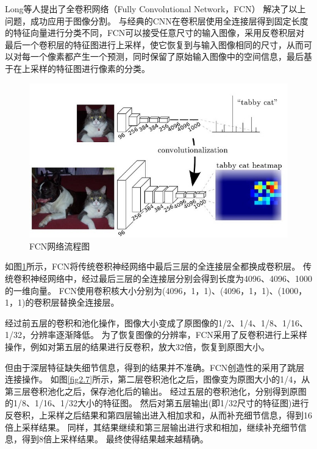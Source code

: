 Long等人提出了全卷积网络（Fully Convolutional Network，FCN）\cite{long2015fully} 解决了以上问题，成功应用于图像分割。
与经典的CNN在卷积层使用全连接层得到固定长度的特征向量进行分类不同，FCN可以接受任意尺寸的输入图像，采用反卷积层对最后一个卷积层的特征图进行上采样，使它恢复到与输入图像相同的尺寸，从而可以对每一个像素都产生一个预测，同时保留了原始输入图像中的空间信息，最后基于在上采样的特征图进行像素的分类。

\begin{figure}[h]
\begin{center}
\includegraphics[width=1\textwidth]{figures/FCN1.jpg}
\end{center}
\vspace{-5mm}
\caption{FCN网络流程图}
\label{fig2.6}
\end{figure}

如图\ref{fig2.6}所示，FCN将传统卷积神经网络中最后三层的全连接层全都换成卷积层。
传统卷积神经网络中，经过最后三层的全连接层分别会得到长度为4096、4096、1000的一维向量。
FCN使用卷积核大小分别为(4096，1，1)、(4096，1，1)、(1000，1，1)的卷积层替换全连接层。

经过前五层的卷积和池化操作，图像大小变成了原图像的1/2、1/4、1/8、1/16、1/32，分辨率逐渐降低。
为了恢复图像的分辨率，FCN采用了反卷积进行上采样操作，例如对第五层的结果进行反卷积，放大32倍，恢复到原图大小。

但由于深层特征缺失细节信息，得到的结果并不准确。FCN创造性的采用了跳层连接操作。
如图\ref{fig2.7}所示，第二层卷积池化之后，图像变为原图大小的1/4，从第三层卷积池化之后，保存池化后的输出。
经过五层的卷积池化，分别得到原图的1/8、1/16、1/32大小的特征图。
然后对第五层输出(即1/32尺寸的特征图)进行反卷积，上采样之后结果和第四层输出进入相加求和，从而补充细节信息，得到16 倍上采样结果。
同样，其结果继续和第三层输出进行求和相加，继续补充细节信息，得到8倍上采样结果。
最终使得结果越来越精确。

